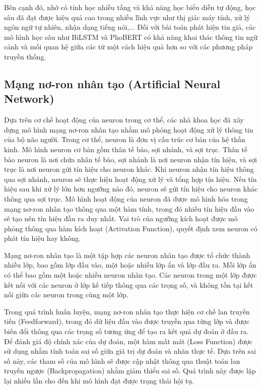 \documentclass[12pt, a4paper]{report}
\begin{document}
Bên cạnh đó, nhờ có tính học nhiều tầng và khả năng học biểu diễn tự động, học sâu đã đạt được hiệu quả cao trong nhiều lĩnh vực như thị giác máy tính, xử lý ngôn ngữ tự nhiên, nhận dạng tiếng nói,... Đối với bài toán phát hiện tin giả, các mô hình học sâu như BiLSTM và PhoBERT có khả năng khai thác thông tin ngữ cảnh và mối quan hệ giữa các từ một cách hiệu quả hơn so với các phương pháp truyền thống.

\subsection{Mạng nơ-ron nhân tạo (Artificial Neural Network)}
Dựa trên cơ chế hoạt động của neuron trong cơ thể, các nhà khoa học đã xây dựng mô hình mạng nơ-ron nhân tạo nhằm mô phỏng hoạt động xử lý thông tin của bộ não người. Trong cơ thể, neuron là đơn vị cấu trúc cơ bản của hệ thần kinh. Mô hình neuron cơ bản gồm thân tế bào, sợi nhánh, và sợi trục. Thân tế bào neuron là nơi chứa nhân tế bào, sợi nhánh là nơi neuron nhận tín hiệu, và sợi trục là nơi neuron gửi tín hiệu cho neuron khác. Khi neuron nhận tín hiệu thông qua sợi nhánh, neuron sẽ thực hiện hoạt động xử lý và tổng hợp tín hiệu. Nếu tín hiệu sau khi xử lý lớn hơn ngưỡng nào đó, neuron sẽ gửi tín hiệu cho neuron khác thông qua sợi trục. Mô hình hoạt động của neuron đã được mô hình hóa trong mạng nơ-ron nhân tạo thông qua một hàm tính, trong đó nhiều tín hiệu đầu vào sẽ tạo nên tín hiệu đầu ra duy nhất. Vai trò của ngưỡng kích hoạt được mô phỏng thông qua hàm kích hoạt (Activation Function), quyết định xem neuron có phát tín hiệu hay không.

Mạng nơ-ron nhân tạo là một tập hợp các neuron nhân tạo được tổ chức thành nhiều lớp, bao gồm lớp đầu vào, một hoặc nhiều lớp ẩn và lớp đầu ra. Mỗi lớp ẩn có thể bao gồm một hoặc nhiều neuron nhân tạo. Các neuron trong một lớp được kết nối với các neuron ở lớp kế tiếp thông qua các trọng số, và không tồn tại kết nối giữa các neuron trong cùng một lớp.

Trong quá trình huấn luyện, mạng nơ-ron nhân tạo thực hiện cơ chế lan truyền tiến (Feedforward), trong đó dữ liệu đầu vào được truyền qua từng lớp và được biến đổi thông qua các trọng số tương ứng để tạo ra kết quả dự đoán ở đầu ra. Để đánh giá độ chính xác của dự đoán, một hàm mất mát (Loss Function) được sử dụng nhằm tính toán sai số giữa giá trị dự đoán và nhãn thực tế. Dựa trên sai số này, các tham số của mô hình sẽ được cập nhật thông qua thuật toán lan truyền ngược (Backpropagation) nhằm giảm thiểu sai số. Quá trình này được lặp lại nhiều lần cho đến khi mô hình đạt được trạng thái hội tụ.
\end{document}
